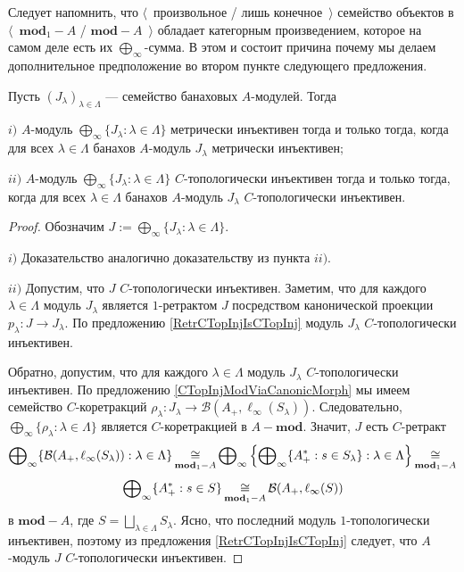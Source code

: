 Следует напомнить, что $\langle$~произвольное / лишь конечное~$\rangle$ семейство объектов в $\langle$~$\mathbf{mod}_1-A$ / $\mathbf{mod}-A$~$\rangle$ обладает категорным произведением, которое на самом деле есть их $\bigoplus_\infty$-сумма. В этом и состоит причина почему мы делаем дополнительное предположение во втором пункте следующего предложения.

\begin{proposition}\label{MetTopInjModProd} Пусть $(J_\lambda)_{\lambda\in\Lambda}$ --- семейство банаховых $A$-модулей. Тогда 

$i)$ $A$-модуль $\bigoplus_\infty\{J_\lambda:\lambda\in\Lambda\}$ метрически инъективен тогда и только тогда, когда для всех $\lambda\in\Lambda$ банахов $A$-модуль $J_\lambda$ метрически инъективен;

$ii)$ $A$-модуль $\bigoplus_\infty\{J_\lambda:\lambda\in\Lambda\}$ $C$-топологически инъективен тогда и только тогда, когда для всех $\lambda\in\Lambda$ банахов $A$-модуль $J_\lambda$ $C$-топологически инъективен.
\end{proposition}
\begin{proof} Обозначим $J:=\bigoplus_\infty\{J_\lambda:\lambda\in\Lambda\}$.

$i)$ Доказательство аналогично доказательству из пункта $ii)$.

$ii)$ Допустим, что $J$ $C$-топологически инъективен. Заметим, что для каждого $\lambda\in\Lambda$ модуль $J_\lambda$ является $1$-ретрактом $J$ посредством канонической проекции $p_\lambda:J\to J_\lambda$. По предложению \ref{RetrCTopInjIsCTopInj} модуль $J_\lambda$ $C$-топологически инъективен.

Обратно, допустим, что для каждого $\lambda\in\Lambda$ модуль $J_\lambda$ $C$-топологически инъективен. По предложению \ref{CTopInjModViaCanonicMorph} мы имеем семейство $C$-коретракций $\rho_\lambda:J_\lambda\to\mathcal{B}(A_+,\ell_\infty(S_\lambda))$. Следовательно, $\bigoplus_\infty\{\rho_\lambda:\lambda\in\Lambda\}$ является $C$-коретракцией в $A-\mathbf{mod}$. Значит, $J$ есть $C$-ретракт 
$$
\bigoplus\nolimits_\infty\{\mathcal{B}(A_+,\ell_\infty(S_\lambda)):\lambda\in\Lambda\}
\mathop{\mathbin{\cong}}\limits_{\mathbf{mod}_1-A}
\bigoplus\nolimits_\infty\left\{\bigoplus\nolimits_\infty\{ A_+^*:s\in S_\lambda\}:\lambda\in\Lambda\right\}
\mathop{\mathbin{\cong}}\limits_{\mathbf{mod}_1-A}
$$
$$
\bigoplus\nolimits_\infty\{A_+^*:s\in S\}
\mathop{\mathbin{\cong}}\limits_{\mathbf{mod}_1-A}
\mathcal{B}(A_+,\ell_\infty(S))
$$
в $\mathbf{mod}-A$, где $S=\bigsqcup_{\lambda\in\Lambda}S_\lambda$. Ясно, что последний модуль $1$-топологически инъективен, поэтому из предложения \ref{RetrCTopInjIsCTopInj} следует, что $A$-модуль $J$ $C$-топологически инъективен.
\end{proof}


